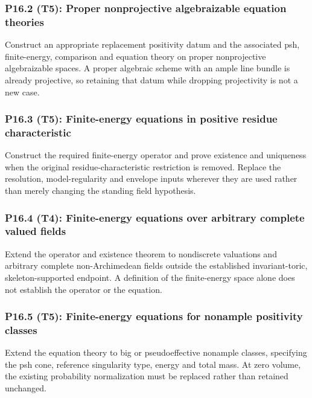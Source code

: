\documentclass[11pt,a4paper]{article}
\theoremstyle{definition}
\theoremstyle{remark}
\begin{document}
\subsubsection*{P16.2 (T5): Proper nonprojective algebraizable equation theories}
\label{atom:P16.2}
Construct an appropriate replacement positivity datum and the associated psh, finite-energy, comparison and equation theory on proper nonprojective algebraizable spaces. A proper algebraic scheme with an ample line bundle is already projective, so retaining that datum while dropping projectivity is not a new case.

\subsubsection*{P16.3 (T5): Finite-energy equations in positive residue characteristic}
\label{atom:P16.3}
Construct the required finite-energy operator and prove existence and uniqueness when the original residue-characteristic restriction is removed. Replace the resolution, model-regularity and envelope inputs wherever they are used rather than merely changing the standing field hypothesis.

\subsubsection*{P16.4 (T4): Finite-energy equations over arbitrary complete valued fields}
\label{atom:P16.4}
Extend the operator and existence theorem to nondiscrete valuations and arbitrary complete non-Archimedean fields outside the established invariant-toric, skeleton-supported endpoint. A definition of the finite-energy space alone does not establish the operator or the equation.

\subsubsection*{P16.5 (T5): Finite-energy equations for nonample positivity classes}
\label{atom:P16.5}
Extend the equation theory to big or pseudoeffective nonample classes, specifying the psh cone, reference singularity type, energy and total mass. At zero volume, the existing probability normalization must be replaced rather than retained unchanged.
\end{document}
